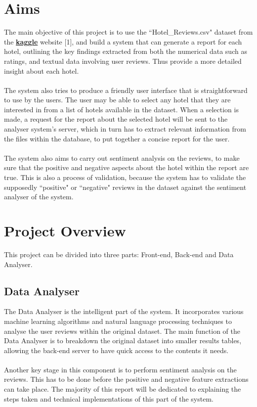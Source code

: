 \documentclass[a4paper]{report}
\begin{document}
\section{Aims}
The main objective of this project is to use the “Hotel\_Reviews.csv" dataset from the \href{https://www.kaggle.com/jiashenliu/515k-hotel-reviews-data-in-europe}{\textbf{kaggle}} website [1], and  build a system that can generate a report for each hotel, outlining the key findings extracted from both the numerical data such as ratings, and textual data involving user reviews. Thus provide a more detailed insight about each hotel.
\\\\
The system also tries to produce a friendly user interface that is straightforward to use by the users. The user may be able to select any hotel that they are interested in from a list of hotels available in the dataset. When a selection is made, a request for the report about the selected hotel will be sent to the analyser system's server, which in turn has to extract relevant information from the files within the database, to put together a concise report for the user.
\\\\
The system also aims to carry out sentiment analysis on the reviews, to make sure that the positive and negative aspects about the hotel within the report are true. This is also a process of validation, because the system has to validate the supposedly “positive" or “negative" reviews in the dataset against the sentiment analyser of the system. 

\section{Project Overview}
This project can be divided into three parts: Front-end, Back-end and Data Analyser. 

\subsection{Data Analyser}
The Data Analyser is the intelligent part of the system. It incorporates various machine learning algorithms and natural language processing techniques to analyse the user reviews within the original dataset. The main function of the Data Analyser is to breakdown the original dataset into smaller results tables, allowing the back-end server to have quick access to the contents it needs.
\\\\
Another key stage in this component is to perform sentiment analysis on the reviews. This has to be done before the positive and negative feature extractions can take place. The majority of this report will be dedicated to explaining the steps taken and technical implementations of this part of the system.
\end{document}
